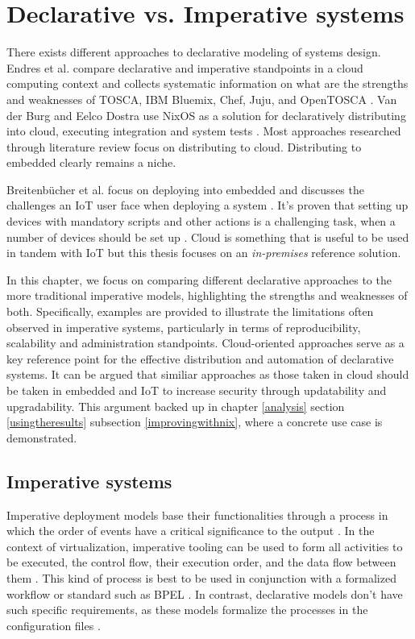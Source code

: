 \chapter{Declarative vs. Imperative systems} \label{imperative}

There exists different approaches to declarative modeling of
systems design. Endres et al. compare declarative and imperative
standpoints in a cloud computing context and collects systematic
information on what are the strengths and weaknesses of TOSCA, IBM
Bluemix, Chef, Juju, and OpenTOSCA \cite{endres2017declarative}. Van
der Burg and Eelco Dostra use NixOS as a solution for declaratively
distributing into cloud, executing integration and system tests
\cite{van2010declarative}. Most approaches researched through
literature review focus on distributing to cloud. Distributing to
embedded clearly remains a niche.

Breitenbücher et al. focus on deploying into embedded and discusses
the challenges an IoT user face when deploying a system \cite{breitenbucher2017declarative}. It's proven
that setting up devices with mandatory scripts and other actions is a
challenging task, when a number of devices should be set up \cite{breitenbucher2017declarative}. Cloud is
something that is useful to be used in tandem with IoT but this thesis
focuses on an \textit{in-premises} reference
solution. 

In this chapter, we focus on comparing different declarative
approaches to the more traditional imperative models, highlighting the
strengths and weaknesses of both. Specifically, examples are provided
to illustrate the limitations often observed in imperative systems,
particularly in terms of reproducibility, scalability and
administration standpoints. Cloud-oriented approaches serve as a key
reference point for the effective distribution and automation of
declarative systems. It can be argued that similiar approaches as
those taken in cloud should be taken in embedded and IoT to increase
security through updatability and upgradability. This argument backed up
in chapter \ref{analysis} section \ref{usingtheresults}
subsection \ref{improvingwithnix}, where a concrete use case is demonstrated.

\section{Imperative systems}

Imperative deployment models base their functionalities through a
process in which the order of events have a critical significance to
the output \cite{breitenbucher2017declarative}. In the context of
virtualization, imperative tooling can be used to form all
activities to be executed, the control flow, their execution order,
and the data flow between them \cite{endres2017declarative}. This kind
of process is best to be used in conjunction with a formalized
workflow or standard such as BPEL \cite{endres2017declarative}. In
contrast, declarative models don't have such specific requirements, as
these models formalize the processes in the configuration files
\cite{endres2017declarative}.


